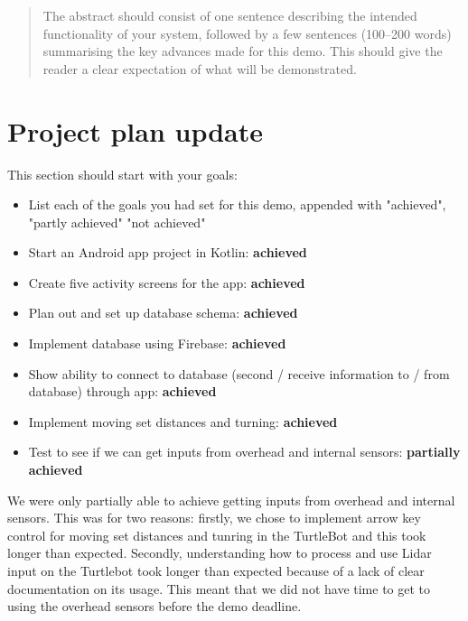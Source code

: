 \documentclass{article}
\begin{document}
 



\begin{abstract} 
The abstract should consist of one sentence describing the intended functionality of your system, followed by a few sentences (100--200 words) summarising the key advances made for this demo. This should give the reader a clear expectation of what will be demonstrated.
\end{abstract} 

\section{Project plan update} 

This section should start with your goals:
\begin{itemize}
\item List each of the goals you had set for this demo, appended with "achieved", "partly achieved" "not achieved"
\item Start an Android app project in Kotlin: {\bf achieved}
\item Create five activity screens for the app: {\bf achieved}
\item Plan out and set up database schema: {\bf achieved}
\item Implement database using Firebase: {\bf achieved}
\item Show ability to connect to database (second / receive information to / from database) through app: {\bf achieved}
\item Implement moving set distances and turning: {\bf achieved}
\item Test to see if we can get inputs from overhead and internal sensors: {\bf partially achieved}
\end{itemize}

We were only partially able to achieve getting inputs from overhead and internal sensors. This was for two reasons: firstly, we chose to implement arrow key control for moving set distances and tunring in the TurtleBot and this took longer than expected. Secondly, understanding how to process and use Lidar input on the Turtlebot took longer than expected because of a lack of clear documentation on its usage. This meant that we did not have time to get to using the overhead sensors before the demo deadline. 
\end{document}
